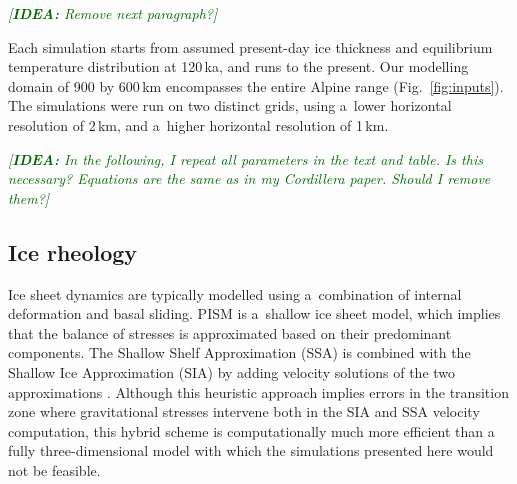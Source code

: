 \documentclass[tc, manuscript]{copernicus}
\newcommand{\idea}[1]{\textcolor{darkgreen}{\emph{[\textbf{IDEA:} #1]}}}
\begin{document}
    \idea{Remove next paragraph?}

    Each simulation starts from assumed present-day ice thickness and
    equilibrium temperature distribution at 120\,\unit{ka}, and runs to the
    present. Our modelling domain of 900 by 600\,\unit{km} encompasses the
    entire Alpine range (Fig.~\ref{fig:inputs}). The simulations were run on
    two distinct grids, using a~lower horizontal resolution of 2\,\unit{km},
    and a~higher horizontal resolution of 1\,\unit{km}.

    \idea{In the following, I repeat all parameters in the text and table. Is
          this necessary? Equations are the same as in my Cordillera paper.
          Should I remove them?}


\subsection{Ice rheology}
\label{sec:icedyn}

    Ice sheet dynamics are typically modelled using a~combination of internal
    deformation and basal sliding. PISM is a~shallow ice sheet model, which
    implies that the balance of stresses is approximated based on their
    predominant components. The Shallow Shelf Approximation (SSA) is combined
    with the Shallow Ice Approximation (SIA) by adding velocity solutions of
    the two approximations \citep[Eqs.~7--9 and 15]{Winkelmann.etal.2011}.
    Although this heuristic approach implies errors in the transition zone
    where gravitational stresses intervene both in the SIA and SSA velocity
    computation, this hybrid scheme is computationally much more efficient than
    a fully three-dimensional model with which the simulations presented here
    would not be feasible.
\end{document}

